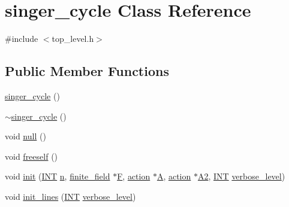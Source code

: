 \hypertarget{classsinger__cycle}{}\section{singer\+\_\+cycle Class Reference}
\label{classsinger__cycle}


{\ttfamily \#include $<$top\+\_\+level.\+h$>$}

\subsection*{Public Member Functions}
\begin{DoxyCompactItemize}
\item 
\mbox{\hyperlink{classsinger__cycle_af1bad5ac4c9d96a726c59c131d69689e}{singer\+\_\+cycle}} ()
\item 
\mbox{\hyperlink{classsinger__cycle_a6bb69cd5e023ec4f8d5bb44ebba09d5b}{$\sim$singer\+\_\+cycle}} ()
\item 
void \mbox{\hyperlink{classsinger__cycle_ad982115b1ef4bd276a045d2ca939934d}{null}} ()
\item 
void \mbox{\hyperlink{classsinger__cycle_a5c42f269d17c204e0c7944220818b3cd}{freeself}} ()
\item 
void \mbox{\hyperlink{classsinger__cycle_a81f4ff6af04557deb4e65cf559e2c91d}{init}} (\mbox{\hyperlink{galois_8h_a09fddde158a3a20bd2dcadb609de11dc}{I\+NT}} \mbox{\hyperlink{classsinger__cycle_aaec1b564faa026e9aae152723757b6dc}{n}}, \mbox{\hyperlink{classfinite__field}{finite\+\_\+field}} $\ast$\mbox{\hyperlink{classsinger__cycle_a863c648286d6bec6fb09c10f642aa5e7}{F}}, \mbox{\hyperlink{classaction}{action}} $\ast$\mbox{\hyperlink{classsinger__cycle_a5713ae53a0be8a6f6511cad8be752350}{A}}, \mbox{\hyperlink{classaction}{action}} $\ast$\mbox{\hyperlink{classsinger__cycle_a022567c51585251ed3c122a16d4fe156}{A2}}, \mbox{\hyperlink{galois_8h_a09fddde158a3a20bd2dcadb609de11dc}{I\+NT}} \mbox{\hyperlink{simeon_8_c_a818073fbcc2f439e7c56952f67386122}{verbose\+\_\+level}})
\item 
void \mbox{\hyperlink{classsinger__cycle_a817cbf613596d5db2cf5e926db8fa328}{init\+\_\+lines}} (\mbox{\hyperlink{galois_8h_a09fddde158a3a20bd2dcadb609de11dc}{I\+NT}} \mbox{\hyperlink{simeon_8_c_a818073fbcc2f439e7c56952f67386122}{verbose\+\_\+level}})
\end{DoxyCompactItemize}
